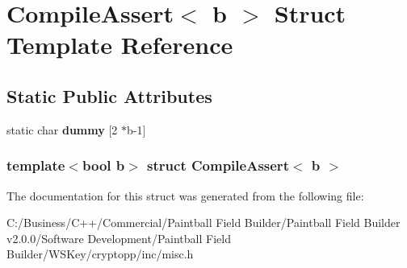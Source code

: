 \hypertarget{struct_compile_assert}{
\section{CompileAssert$<$ b $>$ Struct Template Reference}
\label{struct_compile_assert}
}
\subsection*{Static Public Attributes}
\begin{DoxyCompactItemize}
\item 
\hypertarget{struct_compile_assert_a3def7fe0ca9d70767176ffb275bf923a}{
static char {\bfseries dummy} \mbox{[}2 $\ast$b-\/1\mbox{]}}
\label{struct_compile_assert_a3def7fe0ca9d70767176ffb275bf923a}

\end{DoxyCompactItemize}
\subsubsection*{template$<$bool b$>$ struct CompileAssert$<$ b $>$}



The documentation for this struct was generated from the following file:\begin{DoxyCompactItemize}
\item 
C:/Business/C++/Commercial/Paintball Field Builder/Paintball Field Builder v2.0.0/Software Development/Paintball Field Builder/WSKey/cryptopp/inc/misc.h\end{DoxyCompactItemize}
